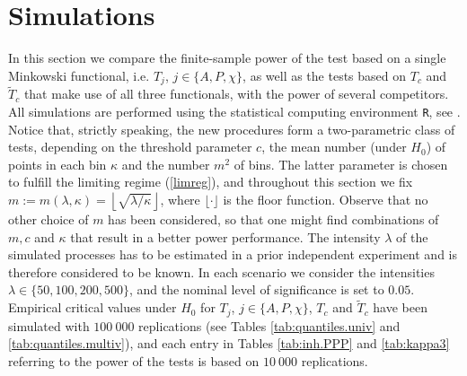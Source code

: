 \documentclass[12pt]{article}
\begin{document}

\section{Simulations}\label{sec:simul}
In this section we compare the finite-sample power of the test based on a single Minkowski functional, i.e. $T_j$, $j\in\{A,P,\chi\}$, as well as the tests based on $T_c$ and $\widetilde{T}_c$ that make use of all three functionals, with the power of several competitors. All simulations are performed using the statistical computing environment {\tt R}, see \cite{31}. Notice that, strictly speaking, the new procedures form a two-parametric class of tests, depending on the threshold parameter $c$, the mean number (under $H_0$) of points in each bin $\kappa$ and the number $m^2$ of bins. The latter parameter is chosen to fulfill the limiting regime (\ref{limreg}), and throughout this section we fix $m:=m(\lambda,\kappa)=\scriptstyle\left\lfloor\sqrt{\lambda\slash\kappa}\right\rfloor$, where $\lfloor\cdot\rfloor$ is the floor function. Observe that no other choice of $m$ has been considered, so that one might find combinations of $m,c$ and $\kappa$ that result in a better power performance. The intensity $\lambda$ of the simulated processes has to be estimated in a prior independent experiment and is therefore considered to be known. In each scenario we consider the intensities $\lambda\in\{50,100,200,500\}$, and the nominal level of significance is set to $0.05$. Empirical critical values under $H_0$ for $T_j$, $j\in\{A,P,\chi\}$, $T_c$ and $\widetilde{T}_c$ have been simulated with $100~000$ replications (see Tables \ref{tab:quantiles.univ} and \ref{tab:quantiles.multiv}), and each entry in Tables \ref{tab:inh.PPP} and \ref{tab:kappa3} referring to the power of the tests is based on $10~000$ replications.
\end{document}
